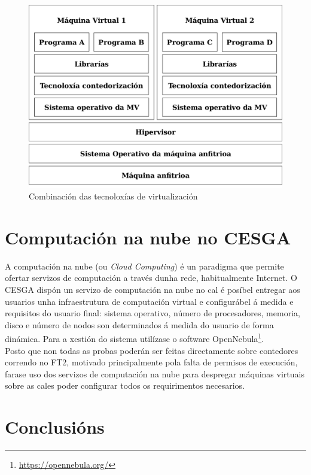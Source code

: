 \begin{figure}
\centerline{\includegraphics[width=15cm]{figuras/CombinacionVirtualizacion.png}}
\caption{Combinación das tecnoloxías de virtualización}
\label{CombinacionVirtualizacion}
\end{figure}

\section{Computación na nube no \gls{CESGA}}

A computación na nube (ou \textit{Cloud Computing}) é un paradigma que permite ofertar servizos de computación a través dunha rede, habitualmente Internet. O \gls{CESGA} dispón un servizo de computación na nube no cal é posíbel entregar aos usuarios unha infraestrutura de computación virtual e configurábel á medida e requisitos do usuario final: sistema operativo, número de procesadores, memoria, disco e número de nodos son determinados á medida do usuario de forma dinámica. Para a xestión do sistema utilízase o software OpenNebula\footnote{\url{https://opennebula.org/}}. \cite{CloudCESGA}\\

Posto que non todas as probas poderán ser feitas directamente sobre contedores correndo no \gls{FT2}, motivado principalmente pola falta de permisos de execución, farase uso dos servizos de computación na nube para despregar máquinas virtuais sobre as cales poder configurar todos os requirimentos necesarios.

\section{Conclusións}

